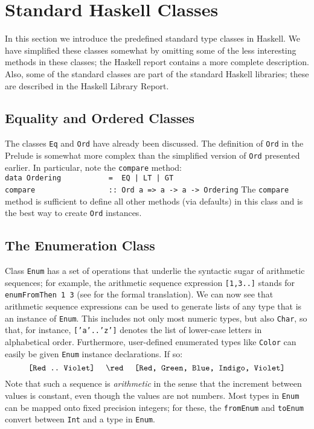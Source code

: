 

\section{Standard Haskell Classes}

In this section we introduce the predefined standard type
classes in Haskell.  We have simplified these classes somewhat by
omitting some of the less interesting methods in these classes; the
Haskell report contains a more complete description.  Also, some of
the standard classes are part of the standard Haskell libraries; these
are described in the Haskell Library Report.

\subsection{Equality and Ordered Classes}

The classes \mbox{\tt Eq} and \mbox{\tt Ord} have already been discussed.  The
definition of \mbox{\tt Ord} in the Prelude is somewhat more complex than the
simplified version of \mbox{\tt Ord} presented earlier.  In particular, note the
\mbox{\tt compare} method:
\bprog
\mbox{\tt data\ Ordering\ \ \ \ \ \ \ \ \ \ \ =\ \ EQ\ |\ LT\ |\ GT\ }\\
\mbox{\tt compare\ \ \ \ \ \ \ \ \ \ \ \ \ \ \ \ \ ::\ Ord\ a\ =>\ a\ ->\ a\ ->\ Ordering}
\eprog
The \mbox{\tt compare} method is sufficient to define all other
methods (via defaults) in this class and is the best way to create
\mbox{\tt Ord} instances. 

\subsection{The Enumeration Class}
\label{tut-enum-classes}

Class \mbox{\tt Enum} has a set of operations that underlie the syntactic sugar of
arithmetic sequences; for example, the arithmetic sequence expression
\mbox{\tt [1,3..]} stands for \mbox{\tt enumFromThen\ 1\ 3} (see
 for the formal translation).  
We can now see that arithmetic sequence expressions can be used to
generate lists of any type that is an instance of \mbox{\tt Enum}.  This
includes not only most numeric types, but also \mbox{\tt Char}, so that, for
instance, \mbox{\tt ['a'..'z']} denotes the list of lower-case letters in
alphabetical order.  Furthermore, user-defined enumerated types like
\mbox{\tt Color} can easily be given \mbox{\tt Enum} instance declarations.  If so:
\[ \mbox{\tt [Red\ ..\ Violet]}\ \ \ \ \red\ \ \ \ \mbox{\tt [Red,\ Green,\ Blue,\ Indigo,\ Violet]}
\]
Note that such a sequence is {\em arithmetic} in the sense that the
increment between values is constant, even though the values are not
numbers.  Most types in \mbox{\tt Enum} can be mapped onto fixed precision
integers; for these, 
the \mbox{\tt fromEnum} and \mbox{\tt toEnum} convert between \mbox{\tt Int} and a type in \mbox{\tt Enum}.

